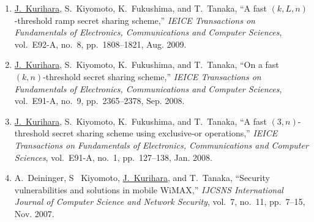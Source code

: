 \begin{enumerate}
    T.~Tanaka, ``A stream authentication method for one-seg
    broadcasting,'' \textit{Journal of the Institute of Image
    Information and Television Engineers},
    vol.~64, no.~12, pp.~1921--1932, Dec. 2010. (in Japanese)
  \item \underline{J.~Kurihara}, S.~Kiyomoto, K.~Fukushima, and
    T.~Tanaka, ``A fast $(k,L,n)$-threshold ramp secret sharing
    scheme,'' \textit{IEICE Transactions on Fundamentals of Electronics, Communications and Computer Sciences},
    vol.~E92-A, no.~8, pp.~1808--1821, Aug. 2009.
  \item \underline{J.~Kurihara}, S.~Kiyomoto, K.~Fukushima, and
    T.~Tanaka, ``On a fast $(k,n)$-threshold secret sharing scheme,''
    \textit{IEICE Transactions on Fundamentals of Electronics, Communications and Computer Sciences},
    vol.~E91-A, no.~9, pp.~2365--2378, Sep. 2008.
  \item \underline{J.~Kurihara}, S.~Kiyomoto, K.~Fukushima, and
    T.~Tanaka, ``A fast $(3,n)$-threshold secret sharing scheme using
    exclusive-or operations,''
    \textit{IEICE Transactions on Fundamentals of Electronics, Communications and Computer Sciences},
    vol.~E91-A, no.~1, pp.~127--138, Jan. 2008.
  \item A.~Deininger, S~ Kiyomoto, \underline{J.~Kurihara}, and
    T.~Tanaka, ``Security vulnerabilities and solutions in mobile
    WiMAX,'' \textit{IJCSNS International Journal of Computer Science
    and Network Security}, vol.~7, no.~11, pp.~7--15, Nov. 2007.
\end{enumerate}
